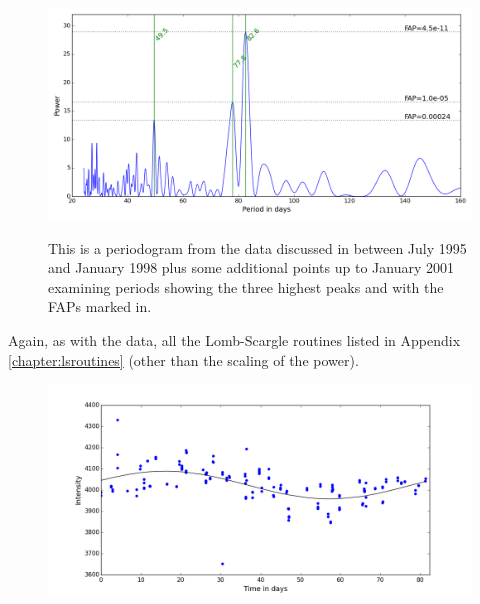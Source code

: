 \begin{figure}[!htbp]
\begin{center}
\includegraphics[scale=0.50]{Figures/hstb4min.png} \\
\end{center}
\caption{This is a periodogram  from the {\hst} data discussed in \citet{benedict98} between July 1995 and
  January 1998 plus some additional points up to January 2001 examining periods showing the three highest peaks and with
  the FAPs marked in. }
\protect\label{fig:hstb4min}
\end{figure}

Again, as with the {\asas} data, all the Lomb-Scargle routines listed in Appendix \ref{chapter:lsroutines}
 (other than the scaling of the power). 

\begin{figure}[!htbp]
\begin{center}
\includegraphics[scale=0.50]{Figures/hstpfold.png} \\
\end{center}
\caption{}
\protect\label{fig:hstpf}
\end{figure}

